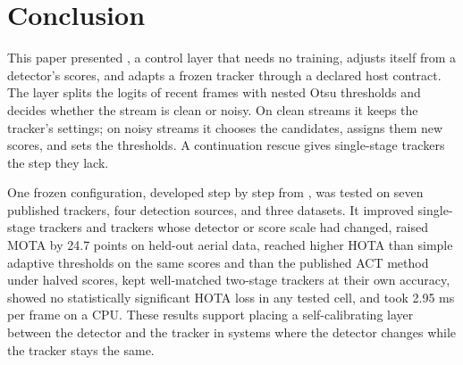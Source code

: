 \section{Conclusion}\label{sec:conclusion}

This paper presented \scl{}, a control layer that needs no training, adjusts
itself from a detector's scores, and adapts a frozen tracker through a
declared host contract. The layer splits the logits of recent frames with
nested Otsu thresholds and decides whether the stream is clean or noisy. On
clean streams it keeps the tracker's settings; on noisy streams it chooses
the candidates, assigns them new scores, and sets the thresholds. A
continuation rescue gives single-stage trackers the step they lack.

One frozen configuration, developed step by step from \aob{}, was tested on
seven published trackers, four detection sources, and three datasets. It
improved single-stage trackers and trackers whose detector or score scale had
changed, raised MOTA by 24.7 points on held-out aerial data, reached higher HOTA than
simple adaptive thresholds on the same scores and than the published ACT
method under halved scores, kept well-matched two-stage
trackers at their own accuracy, showed no statistically significant HOTA loss
in any tested cell, and took 2.95 ms per frame on a CPU. These results support placing a self-calibrating
layer between the detector and the tracker in systems where the detector
changes while the tracker stays the same.
